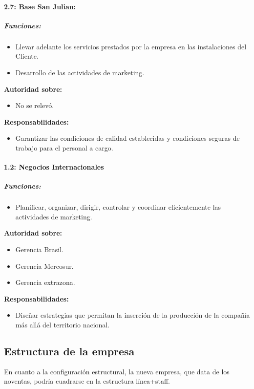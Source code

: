 \documentclass[a4paper,10pt]{article}
\begin{document}
			\paragraph{2.7: Base San Julian:}
		\subparagraph{Funciones:}
			\begin{itemize}
	 			\item Llevar adelante los servicios prestados por la empresa en las instalaciones del Cliente.
	 			\item Desarrollo de las actividades de marketing.
	 		\end{itemize}
			

		\textbf{Autoridad sobre:} 
		\begin{itemize}
			\item No se relevó.
		\end{itemize}

		\textbf{Responsabilidades:}
		\begin{itemize}
			\item Garantizar las condiciones de calidad establecidas y condiciones seguras de trabajo para el personal a cargo.
		\end{itemize}

		\paragraph{1.2: Negocios Internacionales}
	\subparagraph{Funciones:}
			\begin{itemize}
	 			\item Planificar, organizar, dirigir, controlar y coordinar eficientemente las actividades de marketing.
	 		\end{itemize}
			

		\textbf{Autoridad sobre:} 
		\begin{itemize}
			\item Gerencia Brasil.
			\item Gerencia Mercosur.
			\item Gerencia extrazona.
		\end{itemize}

		\textbf{Responsabilidades:}
		\begin{itemize}
			\item Diseñar estrategias que permitan la inserción de la producción de la compañía más allá del territorio nacional.
		\end{itemize}

			


\subsection{Estructura de la empresa}
En cuanto a la configuración estructural, la nueva empresa, que data de los noventas, podría cuadrarse en la estructura línea+staff.
\end{document}
